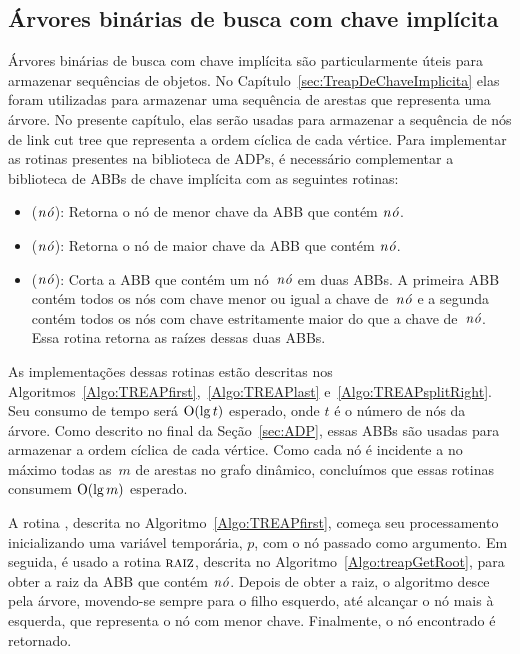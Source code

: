 \subsection{Árvores binárias de busca com chave implícita}
\label{sec:extrastructABB}

Árvores binárias de busca com chave implícita são particularmente úteis para armazenar sequências de objetos.
No Capítulo~\ref{sec:TreapDeChaveImplicita} elas foram utilizadas para armazenar uma sequência de arestas que representa uma árvore.
No presente capítulo, elas serão usadas para armazenar a sequência de nós de link cut tree que representa a ordem cíclica de cada vértice.
Para implementar as rotinas presentes na biblioteca de ADPs, é necessário complementar a biblioteca de ABBs de chave implícita com as seguintes rotinas:
\begin{itemize}
\item \treapFirst($\mathit{n\acute{o}}$): Retorna o nó de menor chave da ABB que contém $\mathit{n\acute{o}}$.
\item \treapLast($\mathit{n\acute{o}}$): Retorna o nó de maior chave da ABB que contém $\mathit{n\acute{o}}$.
\item \treapSplitRight($\mathit{n\acute{o}}$): Corta a ABB que contém um nó~$\mathit{n\acute{o}}$ em duas ABBs. A primeira ABB contém todos os nós com chave menor ou igual a chave de~$\mathit{n\acute{o}}$ e a segunda contém todos os nós com chave estritamente maior do que a chave de~$\mathit{n\acute{o}}$. Essa rotina retorna as raízes dessas duas ABBs.
\end{itemize}

As implementações dessas rotinas estão descritas nos Algoritmos~\ref{Algo:TREAPfirst},~\ref{Algo:TREAPlast} e~\ref{Algo:TREAPsplitRight}.
Seu consumo de tempo será $\mathrm{O}(\lg t)$ esperado, onde $t$ é o número de nós da árvore.
Como descrito no final da Seção~\ref{sec:ADP}, essas ABBs são usadas para armazenar a ordem cíclica de cada vértice.
Como cada nó é incidente a no máximo todas as~$m$ de arestas no grafo dinâmico, concluímos que essas rotinas consumem $\mathrm{O}(\lg m)$ esperado.  

A rotina \treapFirst{}, descrita no Algoritmo~\ref{Algo:TREAPfirst}, começa seu processamento inicializando uma variável temporária, $p$, com o nó passado como argumento.
Em seguida, é usado a rotina $\text{\scshape raiz}$, descrita no Algoritmo~\ref{Algo:treapGetRoot}, para obter a raiz da ABB que contém $\mathit{n\acute{o}}$.
Depois de obter a raiz, o algoritmo desce pela árvore, movendo-se sempre para o filho esquerdo, até alcançar o nó mais à esquerda, que representa o nó com menor chave.
Finalmente, o nó encontrado é retornado.

